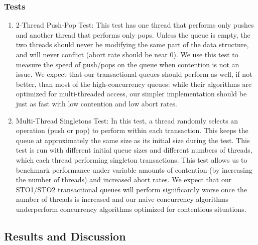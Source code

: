 \subsubsection{Tests}
\begin{enumerate}
\item 2-Thread Push-Pop Test: This test has one thread that performs only pushes and another thread that performs only pops. Unless the queue is empty, the two threads should never be modifying the same part of the data structure, and will never conflict (abort rate should be near 0). We use this test to measure the speed of push/pops on the queue when contention is not an issue. We expect that our transactional queues should perform as well, if not better, than most of the high-concurrency queues: while their algorithms are optimized for multi-threaded access, our simpler implementation should be just as fast with low contention and low abort rates.

\item Multi-Thread Singletons Test: 
    In this test, a thread randomly selects an operation (push or pop) to perform within each transaction. This keeps the queue at approximately the same size as its initial size during the test. This test is run with different initial queue sizes and different numbers of threads, which each thread performing singleton transactions. This test allows us to benchmark performance under variable amounts of contention (by increasing the number of threads) and increased abort rates. We expect that our STO1/STO2 transactional queues will perform significantly worse once the number of threads is increased and our naive concurrency algorithms underperform concurrency algorithms optimized for contentious situations.
    
    
\end{enumerate}

\subsection{Results and Discussion}

